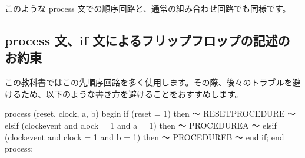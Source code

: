 \documentclass[letterpaper,10pt,dvipdfmx]{sphinxmanual}
\begin{document}
\begin{sphinxVerbatim}[commandchars=\\\{\}]
  
   
        
        
       
         
   
  

    
     
      
          
        
     
   

    
    

 
\end{sphinxVerbatim}

このような process 文での順序回路と、通常の組み合わせ回路でも同様です。


\subsection{process 文、if 文によるフリップフロップの記述のお約束}
\label{\detokenize{05_try:process-if}}
この教科書ではこの先順序回路を多く使用します。その際、後々のトラブルを避けるため、以下のような書き方を避けることをおすすめします。

\begin{sphinxVerbatim}[commandchars=\\\{\}]
process (reset, clock, a, b)
begin
  if (reset = \PYGZsq{}1\PYGZsq{}) then
    ～ RESET\PYGZhy{}PROCEDURE ～
  elsif (clock\PYGZsq{}event and clock = \PYGZsq{}1\PYGZsq{} and a = \PYGZsq{}1\PYGZsq{}) then
    ～ PROCEDURE\PYGZhy{}A ～
  elsif (clock\PYGZsq{}event and clock = \PYGZsq{}1\PYGZsq{} and b = \PYGZsq{}1\PYGZsq{}) then
    ～ PROCEDURE\PYGZhy{}B ～
  end if;
end process;
\end{sphinxVerbatim}
\end{document}
